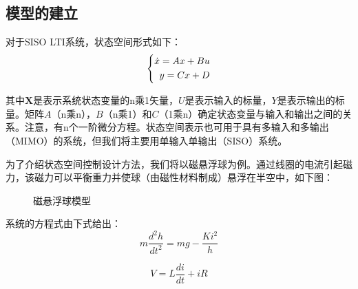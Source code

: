 \documentclass[UTF8]{ctexart}
\begin{document}
\subsection{ 模型的建立}
\par 对于SISO LTI系统，状态空间形式如下：
\begin{equation}
   \left  \{\begin{aligned}
      \dot x=Ax+Bu    \\
      y=Cx+D     \\
        \end{aligned}\\
    \right.
 \end{equation}
 
\par 
其中$ \mathbf {X} $是表示系统状态变量的n乘1矢量，$ U $是表示输入的标量，$ Y $是表示输出的标量。矩阵$ A $（n乘n），$ B $（n乘1）和$ C $（1乘n）确定状态变量与输入和输出之间的关系。注意，有n个一阶微分方程。状态空间表示也可用于具有多输入和多输出（MIMO）的系统，但我们将主要用单输入单输出（SISO）系统。
\par  为了介绍状态空间控制设计方法，我们将以磁悬浮球为例。通过线圈的电流引起磁力，该磁力可以平衡重力并使球（由磁性材料制成）悬浮在半空中，如下图：

\par \begin{figure}[h]   
  \caption{\label{1} 磁悬浮球模型}      
 \end{figure}
 
\par 系统的方程式由下式给出：
\begin{equation}
m\frac {d^{2}h}{dt^{2}}=mg- \frac {Ki^{2}}{h}
\end{equation}

\begin{equation}
V=L\frac {di}{dt}+iR
\end{equation}
\end{document}
